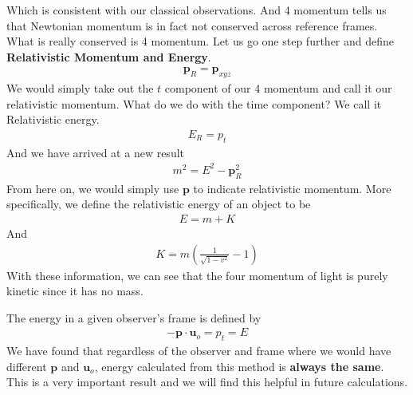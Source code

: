 \documentclass[11pt,letterpaper]{book}
\newcommand{\paren}[1]{\left( #1 \right)}
\begin{document}
Which is consistent with our classical observations. And 4 momentum tells us that Newtonian momentum is in fact not conserved across reference frames. What is really conserved is 4 momentum. Let us go one step further and define \textbf{Relativistic Momentum and Energy}.
\begin{align}
\mathbf{p}_R = \mathbf{p}_{xyz} 
\end{align}
We would simply take out the $t$ component of our 4 momentum and call it our relativistic momentum. What do we do with the time component? We call it Relativistic energy.
\begin{align}
E_R = p_t
\end{align}
And we have arrived at a new result
\begin{align}
m^2 = E^2 - \mathbf{p}_R^2
\end{align}
From here on, we would simply use $\mathbf{p}$ to indicate relativistic momentum. More specifically, we define the relativistic energy of an object to be
\begin{align}
E = m + K
\end{align}
And 
\begin{align}
K = m\paren{\frac{1}{\sqrt{1-v^2}}-1}
\end{align}
With these information, we can see that the four momentum of light is purely kinetic since it has no mass. 

The energy in a given observer's frame is defined by
\begin{align}
-\mathbf{p}\cdot \mathbf{u}_{o} = p_t = E
\end{align}
We have found that regardless of the observer and frame where we would have different $\mathbf{p}$ and $\mathbf{u}_o$, energy calculated from this method is \textbf{always the same}. This is a very important result and we will find this helpful in future calculations. 
\end{document}
